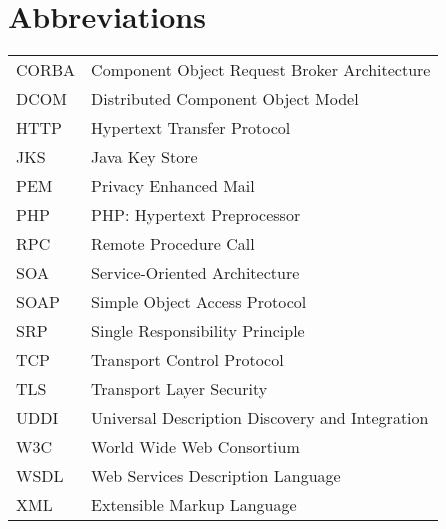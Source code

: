 
\chapter*{Abbreviations}

\begin{tabular}{p{20mm}p{120mm}}

  CORBA & Component Object Request Broker Architecture \\
  DCOM & Distributed Component Object Model \\
  HTTP & Hypertext Transfer Protocol \\
  JKS & Java Key Store \\
  PEM & Privacy Enhanced Mail \\
  PHP & PHP: Hypertext Preprocessor \\
  RPC & Remote Procedure Call \\
  SOA & Service-Oriented Architecture \\
  SOAP & Simple Object Access Protocol \\
  SRP & Single Responsibility Principle \\
  TCP & Transport Control Protocol \\
  TLS & Transport Layer Security\\
  UDDI & Universal Description Discovery and Integration \\
  W3C & World Wide Web Consortium \\
  WSDL & Web Services Description Language \\
  XML & Extensible Markup Language \\

\end{tabular}
